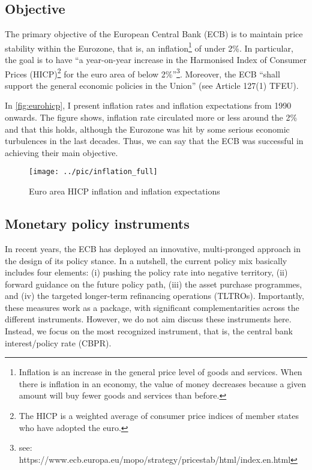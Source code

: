 \subsection{Objective}
The primary objective of the European Central Bank (ECB) is to maintain price stability within the Eurozone, that is, an inflation\footnote{Inflation is an increase in the general price level of goods and services. When there is inflation in an economy, the value of money decreases because a given amount will buy fewer goods and services than before.} of under 2\%. In particular, the goal is to have ``a year-on-year increase in the Harmonised Index of Consumer Prices (HICP)\footnote{The HICP is a weighted average of consumer price indices of member states who have adopted the euro.} for the euro area of below 2\%''\footnote{see: https://www.ecb.europa.eu/mopo/strategy/pricestab/html/index.en.html}. Moreover, the ECB ``shall support the general economic policies in the Union'' (see Article 127(1) TFEU).

In \autoref{fig:eurohicp}, I present inflation rates and inflation expectations from 1990 onwards. The figure shows, inflation rate circulated more or less around the 2\% and that this holds, although the Eurozone was hit by some serious economic turbulences in the last decades. Thus, we can say that the ECB was successful in achieving their main objective. 



\begin{figure}
	\begin{center}
		\texttt{[image: ../pic/inflation\_full]}
	\end{center}
\caption{Euro area HICP inflation and inflation expectations}\label{fig:eurohicp}
\end{figure}

\subsection{Monetary policy instruments}
In recent years, the ECB has deployed an innovative, multi-pronged approach in the design of its policy stance. In a nutshell, the current policy mix basically includes four elements: (i) pushing the policy rate into negative territory, (ii) forward guidance on the future policy path, (iii) the asset purchase programmes, and (iv) the targeted longer-term refinancing operations (TLTROs). Importantly, these measures work as a package, with significant complementarities across the different instruments. However, we do not aim discuss these instruments here. Instead, we focus on the most recognized instrument, that is, the central bank interest/policy rate (CBPR). 

